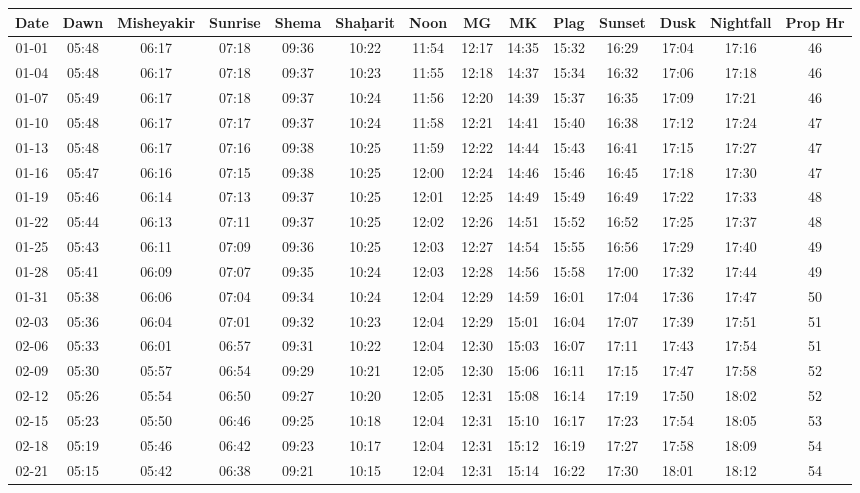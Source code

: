 \begin{footnotesize}
	\begin{longtable}{c | c | c | c | c | c | c | c | c | c | c | c | c | c}
		Date&Dawn&Misheyakir&Sunrise&Shema&Sha\d{h}arit&Noon&MG&MK&Plag&Sunset&Dusk&Nightfall&Prop Hr\\\hline\endhead
		01-01&05:48&06:17&07:18&09:36&10:22&11:54&12:17&14:35&15:32&16:29&17:04&17:16&46\\\hline
		01-04&05:48&06:17&07:18&09:37&10:23&11:55&12:18&14:37&15:34&16:32&17:06&17:18&46\\\hline
		01-07&05:49&06:17&07:18&09:37&10:24&11:56&12:20&14:39&15:37&16:35&17:09&17:21&46\\\hline
		01-10&05:48&06:17&07:17&09:37&10:24&11:58&12:21&14:41&15:40&16:38&17:12&17:24&47\\\hline
		01-13&05:48&06:17&07:16&09:38&10:25&11:59&12:22&14:44&15:43&16:41&17:15&17:27&47\\\hline
		01-16&05:47&06:16&07:15&09:38&10:25&12:00&12:24&14:46&15:46&16:45&17:18&17:30&47\\\hline
		01-19&05:46&06:14&07:13&09:37&10:25&12:01&12:25&14:49&15:49&16:49&17:22&17:33&48\\\hline
		01-22&05:44&06:13&07:11&09:37&10:25&12:02&12:26&14:51&15:52&16:52&17:25&17:37&48\\\hline
		01-25&05:43&06:11&07:09&09:36&10:25&12:03&12:27&14:54&15:55&16:56&17:29&17:40&49\\\hline
		01-28&05:41&06:09&07:07&09:35&10:24&12:03&12:28&14:56&15:58&17:00&17:32&17:44&49\\\hline
		01-31&05:38&06:06&07:04&09:34&10:24&12:04&12:29&14:59&16:01&17:04&17:36&17:47&50\\\hline
		02-03&05:36&06:04&07:01&09:32&10:23&12:04&12:29&15:01&16:04&17:07&17:39&17:51&51\\\hline
		02-06&05:33&06:01&06:57&09:31&10:22&12:04&12:30&15:03&16:07&17:11&17:43&17:54&51\\\hline
		02-09&05:30&05:57&06:54&09:29&10:21&12:05&12:30&15:06&16:11&17:15&17:47&17:58&52\\\hline
		02-12&05:26&05:54&06:50&09:27&10:20&12:05&12:31&15:08&16:14&17:19&17:50&18:02&52\\\hline
		02-15&05:23&05:50&06:46&09:25&10:18&12:04&12:31&15:10&16:17&17:23&17:54&18:05&53\\\hline
		02-18&05:19&05:46&06:42&09:23&10:17&12:04&12:31&15:12&16:19&17:27&17:58&18:09&54\\\hline
		02-21&05:15&05:42&06:38&09:21&10:15&12:04&12:31&15:14&16:22&17:30&18:01&18:12&54\\\hline

\end{longtable}
\end{footnotesize}

